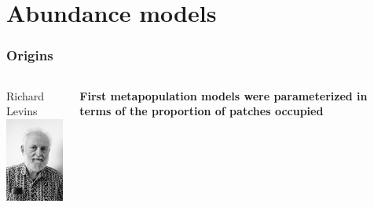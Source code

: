 \documentclass[color=usenames,dvipsnames]{beamer}\usepackage[]{graphicx}\usepackage[]{color}
\begin{document}
\section{Abundance models}



\begin{frame}
  \frametitle{Origins}
  \begin{columns}
    \begin{column}{0.3\textwidth}
      Richard Levins \\
      \includegraphics[width=\textwidth]{figs/levins}
    \end{column}
    \begin{column}{0.7\textwidth}
      {\bf First metapopulation models were parameterized in terms of the
        \alert{proportion of patches occupied} \par}

\end{column}
\end{columns}
\end{frame}
\end{document}
